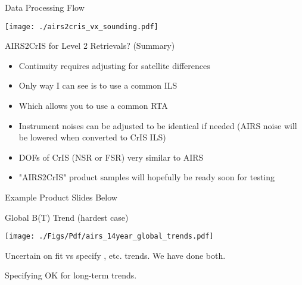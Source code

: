 \documentclass[10pt,t]{beamer}
\begin{document}
\begin{frame}[label=flow]{Data Processing Flow}
\vspace{-0.1in}
\begin{center}
\texttt{[image: ./airs2cris\_vx\_sounding.pdf]}
\end{center}
\end{frame}

\begin{frame}[label={sec:org44ebd97}]{AIRS2CrIS for Level 2 Retrievals?  (Summary)}
\begin{itemize}
\item Continuity requires adjusting for satellite differences
\item Only way I can see is to use a common ILS
\item Which allows you to use a common RTA
\item Instrument noises can be adjusted to be identical if needed (AIRS noise will be lowered when converted to CrIS ILS)
\item DOFs of CrIS (NSR or FSR) very similar to AIRS
\item "AIRS2CrIS" product samples will hopefully be ready soon for testing
\end{itemize}
\end{frame}

\begin{frame}[label={sec:org7c360f5}]{Example Product Slides Below}
\end{frame}
\begin{frame}[label={sec:org6c7c9eb}]{Global B(T) Trend (hardest case)}
\vspace{-0.15in}
\begin{center}
\texttt{[image: ./Figs/Pdf/airs\_14year\_global\_trends.pdf]}
\end{center}

\small
Uncertain on fit vs specify \cd, \methane etc. trends. We have done both.

Specifying OK for long-term trends.  
\end{frame}
\end{document}
